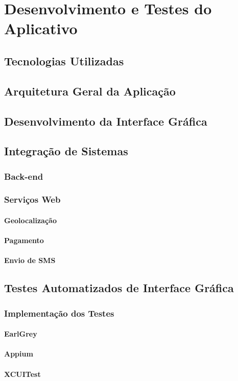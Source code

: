 \chapter{Desenvolvimento e Testes do Aplicativo}

\section{Tecnologias Utilizadas}

\section{Arquitetura Geral da Aplicação}

\section{Desenvolvimento da Interface Gráfica}

\section{Integração de Sistemas}

\subsection{Back-end}

\subsection{Serviços Web}

\subsubsection{Geolocalização}

\subsubsection{Pagamento}

\subsubsection{Envio de SMS}

\section{Testes Automatizados de Interface Gráfica}

\subsection{Implementação dos Testes}

\subsubsection{EarlGrey}

\subsubsection{Appium}

\subsubsection{XCUITest}